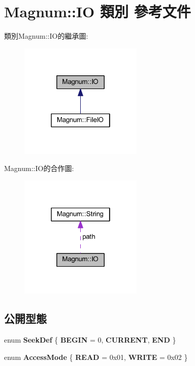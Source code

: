 \hypertarget{class_magnum_1_1_i_o}{}\section{Magnum\+:\+:IO 類別 參考文件}
\label{class_magnum_1_1_i_o}


類別\+Magnum\+:\+:I\+O的繼承圖\+:\nopagebreak
\begin{figure}[H]
\begin{center}
\leavevmode
\includegraphics[width=166pt]{class_magnum_1_1_i_o__inherit__graph}
\end{center}
\end{figure}


Magnum\+:\+:I\+O的合作圖\+:\nopagebreak
\begin{figure}[H]
\begin{center}
\leavevmode
\includegraphics[width=166pt]{class_magnum_1_1_i_o__coll__graph}
\end{center}
\end{figure}
\subsection*{公開型態}
\begin{DoxyCompactItemize}
\item 
enum {\bfseries Seek\+Def} \{ {\bfseries B\+E\+G\+IN} = 0, 
{\bfseries C\+U\+R\+R\+E\+NT}, 
{\bfseries E\+ND}
 \}\hypertarget{class_magnum_1_1_i_o_a1715ee3679da15f05a8014cea2b041c0}{}\label{class_magnum_1_1_i_o_a1715ee3679da15f05a8014cea2b041c0}

\item 
enum {\bfseries Access\+Mode} \{ {\bfseries R\+E\+AD} = 0x01, 
{\bfseries W\+R\+I\+TE} = 0x02
 \}\hypertarget{class_magnum_1_1_i_o_a132fd918819ada2eca610f3936e0f4cf}{}\label{class_magnum_1_1_i_o_a132fd918819ada2eca610f3936e0f4cf}

\end{DoxyCompactItemize}
